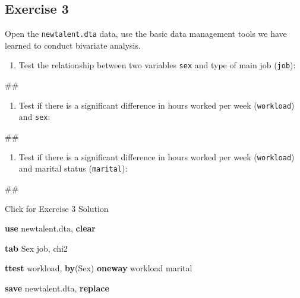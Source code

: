 \documentclass[
]{book}
\newenvironment{Shaded}{\begin{snugshade}}{\end{snugshade}}
\newcommand{\FunctionTok}[1]{\textcolor[rgb]{0.00,0.00,0.00}{#1}}
\newcommand{\KeywordTok}[1]{\textcolor[rgb]{0.13,0.29,0.53}{\textbf{#1}}}
\newcommand{\NormalTok}[1]{#1}
\providecommand{\tightlist}{%
  \setlength{\itemsep}{0pt}\setlength{\parskip}{0pt}}
\begin{document}
\hypertarget{exercise-3-4}{%
\subsection{Exercise 3}\label{exercise-3-4}}

Open the \texttt{newtalent.dta} data, use the basic data management tools we have learned to conduct bivariate analysis.

\begin{enumerate}
\def\labelenumi{\arabic{enumi}.}
\tightlist
\item
  Test the relationship between two variables \texttt{sex} and type of main job (\texttt{job}):
\end{enumerate}

\begin{Shaded}
\begin{Highlighting}[]
\NormalTok{\#\#}
\end{Highlighting}
\end{Shaded}

\begin{enumerate}
\def\labelenumi{\arabic{enumi}.}
\setcounter{enumi}{1}
\tightlist
\item
  Test if there is a significant difference in hours worked per week (\texttt{workload}) and \texttt{sex}:
\end{enumerate}

\begin{Shaded}
\begin{Highlighting}[]
\NormalTok{\#\#}
\end{Highlighting}
\end{Shaded}

\begin{enumerate}
\def\labelenumi{\arabic{enumi}.}
\setcounter{enumi}{2}
\tightlist
\item
  Test if there is a significant difference in hours worked per week (\texttt{workload}) and marital status (\texttt{marital}):
\end{enumerate}

\begin{Shaded}
\begin{Highlighting}[]
\NormalTok{\#\#}
\end{Highlighting}
\end{Shaded}

{Click for Exercise 3 Solution}

\begin{alert}

\begin{Shaded}
\begin{Highlighting}[]
\KeywordTok{use}\NormalTok{ newtalent.dta, }\KeywordTok{clear} 

\KeywordTok{tab}\NormalTok{ Sex job, }\FunctionTok{chi2} 

\KeywordTok{ttest}\NormalTok{ workload, }\KeywordTok{by}\NormalTok{(Sex)}
\KeywordTok{oneway}\NormalTok{ workload marital }

\KeywordTok{save}\NormalTok{ newtalent.dta, }\KeywordTok{replace} 
\end{Highlighting}
\end{Shaded}

\end{alert}
\end{document}
